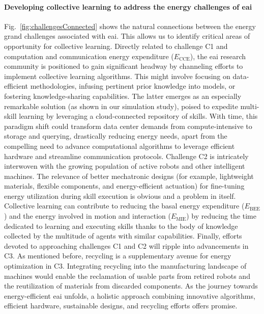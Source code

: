 \documentclass[12pt]{article}
\begin{document}
\paragraph*{Developing collective learning to address the energy challenges of \ac{eai}}
Fig.~\ref{fig:challengesConnected} shows the natural connections between the energy grand challenges associated with \ac{eai}. This allows us to identify critical areas of opportunity for collective learning. Directly related to challenge C1 and computation and communication energy expenditure ($E_\text{CCE}$), the \ac{eai} research community is positioned to gain significant headway by channeling efforts to implement collective learning algorithms. This might involve focusing on data-efficient methodologies, infusing pertinent prior knowledge into models, or fostering knowledge-sharing capabilities. The latter emerges as an especially remarkable solution (as shown in our simulation study), poised to expedite multi-skill learning by leveraging a cloud-connected repository of skills. With time, this paradigm shift could transform data center demands from compute-intensive to storage and querying, drastically reducing energy needs, apart from the compelling need to advance computational algorithms to leverage efficient hardware and streamline communication protocols. Challenge C2 is intricately interwoven with the growing population of active robots and other intelligent machines. The relevance of better mechatronic designs (for example, lightweight materials, flexible components, and energy-efficient actuation) for fine-tuning energy utilization during skill execution is obvious and a problem in itself. Collective learning can contribute to reducing the basal energy expenditure ($E_\text{BEE}$) and the energy involved in motion and interaction ($E_\text{MIE}$) by reducing the time dedicated to learning and executing skills thanks to the body of knowledge collected by the multitude of agents with similar capabilities. Finally, efforts devoted to approaching challenges C1 and C2 will ripple into advancements in C3. As mentioned before, recycling is a supplementary avenue for energy optimization in C3. Integrating recycling into the manufacturing landscape of machines would enable the reclamation of usable parts from retired robots and the reutilization of materials from discarded components. As the journey towards energy-efficient \ac{eai} unfolds, a holistic approach combining innovative algorithms, efficient hardware, sustainable designs, and recycling efforts offers promise.
\end{document}
